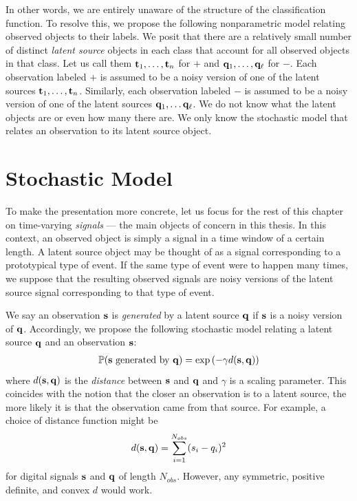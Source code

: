 In other words, we are entirely unaware of the structure of the classification
function. To resolve this, we propose the following nonparametric model relating
observed objects to their labels. We posit that there are a relatively small
number of distinct {\em latent source} objects in each class that account for
all observed objects in that class. Let us call them $\mathbf t_1, \dots, \mathbf t_n$
for $+$ and $\mathbf q_1, \dots, \mathbf q_{\ell}$ for $-$. Each observation labeled $+$
is assumed to be a noisy version of one of the latent sources $\mathbf t_1, \dots,
\mathbf t_n$. Similarly, each observation labeled $-$ is assumed to be a noisy
version of one of the latent sources $\mathbf q_1, \dots \mathbf q_{\ell}$. We do not
know what the latent objects are or even how many there are. We only know the
stochastic model that relates an observation to its latent source object.

\section{Stochastic Model}
To make the presentation more concrete, let us focus for the rest of this
chapter on time-varying {\em signals} --- the main objects of concern in this
thesis. In this context, an observed object is simply a signal in a time window
of a certain length.  A latent source object may be thought of as a signal
corresponding to a prototypical type of event. If the same type of event were to
happen many times, we suppose that the resulting observed signals are noisy
versions of the latent source signal corresponding to that type of event.

We say an observation $\mathbf s$ is {\em generated} by a latent source $\mathbf q$ if $\mathbf s$
is a noisy version of $\mathbf q$. Accordingly, we propose the following stochastic
model relating a latent source $\mathbf q$ and an observation $\mathbf s$:
\begin{gather}
\mathbb{P}(\mathbf s \text{ generated by } \mathbf q) = \exp\left(-\gamma d(\mathbf s,\mathbf q) \right)
\end{gather}
where $d(\mathbf s, \mathbf q)$ is the {\em distance} between $\mathbf s$ and $\mathbf q$ and $\gamma$ is a
scaling parameter. This coincides with the notion that the closer an observation
is to a latent source, the more likely it is that the observation came from that
source. For example, a choice of distance function might be
\begin{gather}
d(\mathbf s,\mathbf q) = \sum_{i=1}^{N_{obs}} (s_i - q_i)^2
\end{gather}
for digital signals $\mathbf s$ and $\mathbf q$ of length $N_{obs}$. However, any
symmetric, positive definite, and convex $d$ would work.

